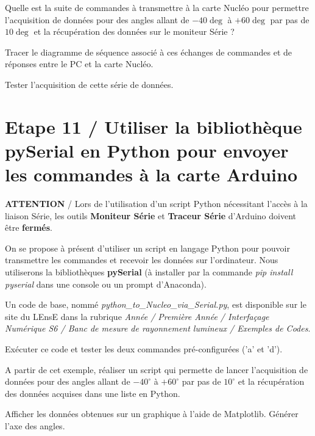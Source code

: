 \documentclass[a4paper,11pt,titlepage]{article} %
\begin{document}
\Quest Quelle est la suite de commandes à transmettre à la carte Nucléo pour permettre l'acquisition de données pour des angles allant de $-40\deg{}$ à $+60\deg{}$ par pas de $10\deg{}$ et la récupération des données sur le moniteur Série ?

\Quest Tracer le diagramme de séquence associé à ces échanges de commandes et de réponses entre le PC et la carte Nucléo.

\Manip Tester l'acquisition de cette série de données.

\newpage
\section{Etape 11 / Utiliser la bibliothèque pySerial en Python pour envoyer les commandes à la carte Arduino}


\begin{mdframed}[style=sidebar,frametitle={}]
\large
\textbf{ATTENTION} / Lors de l'utilisation d'un script Python nécessitant l'accès à la liaison Série, les outils \textbf{Moniteur Série} et \textbf{Traceur Série} d'Arduino doivent être \textbf{fermés}.
\end{mdframed}


\medskip

On se propose à présent d'utiliser un script en langage Python pour pouvoir transmettre les commandes et recevoir les données sur l'ordinateur. Nous utiliserons la bibliothèques \textbf{pySerial} (à installer par la commande \textsl{pip install pyserial} dans une console ou un prompt d'Anaconda).

\medskip

Un code de base, nommé \textsl{python\_to\_Nucleo\_via\_Serial.py}, est disponible sur le site du LEnsE dans la rubrique \textit{Année / Première Année / Interfaçage Numérique S6 / Banc de mesure de rayonnement lumineux / Exemples de Codes}.

\medskip

\Manip Exécuter ce code et tester les deux commandes pré-configurées ('a' et 'd').

\Manip A partir de cet exemple, réaliser un script qui permette de lancer l'acquisition de données pour des angles allant de $-40^\circ{}$ à $+60^\circ{}$ par pas de $10^\circ{}$ et la récupération des données acquises dans une liste en Python.

\Manip Afficher les données obtenues sur un graphique à l'aide de Matplotlib. Générer l'axe des angles.
\end{document}
